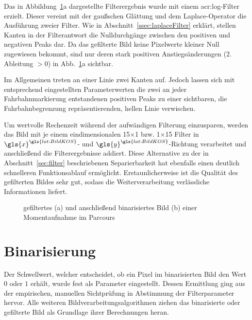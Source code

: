 Das in Abbildung~\ref{fig:bildvorverarbeitung_filtern}a dargestellte Filterergebnis wurde mit einem \gls{acr:log}-Filter erzielt. Dieser vereint mit der gaußschen Glättung und dem Laplace-Operator die Ausführung zweier Filter. Wie in Abschnitt~\ref{ssec:laplaceFilter} erklärt, stellen Kanten in der Filterantwort die Nulldurchgänge zwischen den positiven und negativen Peaks dar. Da das gefilterte Bild keine Pixelwerte kleiner Null zugewiesen bekommt, sind nur deren stark positiven Anstiegsänderungen (2. Ableitung \( > 0\)) in Abb.~\ref{fig:bildvorverarbeitung_filtern}a sichtbar. 

Im Allgemeinen treten an einer Linie zwei Kanten auf. Jedoch lassen sich mit entsprechend eingestellten Parameterwerten die zwei an jeder Fahrbahnmarkierung entstandenen positiven Peaks zu einer sichtbaren, die Fahrbahnbegrenzung repräsentierenden, hellen Linie verwischen. 

Um wertvolle Rechenzeit während der aufwändigen Filterung einzusparen, werden das Bild mit je einem eindimensionalen 15\( \times \)1 bzw. 1\( \times \)15 Filter in \( {\gls{x}}^{\gls{lat:BildKOS}} \)- und \( {\gls{y}}^{\gls{lat:BildKOS}} \)-Richtung verarbeitet und anschließend die Filterergebnisse addiert. Diese Alternative zu der in Abschnitt~\ref{sec:filter} beschriebenen Separierbarkeit hat ebenfalls einen deutlich schnelleren Funktionsablauf ermöglicht. Erstaunlicherweise ist die Qualität des gefilterten Bildes sehr gut, sodass die Weiterverarbeitung verlässliche Informationen liefert.


\begin{figure}[hbtp] %
  \centering
  \hfill
  \caption{gefiltertes (a) und anschließend binarisiertes Bild (b) einer Momentaufnahme im Parcours}
\label{fig:bildvorverarbeitung_filtern}
\end{figure} 

\section{Binarisierung \dcfirstauthorshort}
\label{sec:bildvorverarbeitung:binarisierung}
Der Schwellwert, welcher entscheidet, ob ein Pixel im binarisierten Bild den Wert \glqq \(0\)\grqq{} oder \glqq \(1\)\grqq{} erhält, wurde fest als Parameter eingestellt. Dessen Ermittlung ging aus der empirischen, manuellen Sichtprüfung in Abstimmung der Filterparameter hervor. Alle weiteren Bildverarbeitungsalgorithmen ziehen das binarisierte oder gefilterte Bild als Grundlage ihrer Berechnungen heran.
